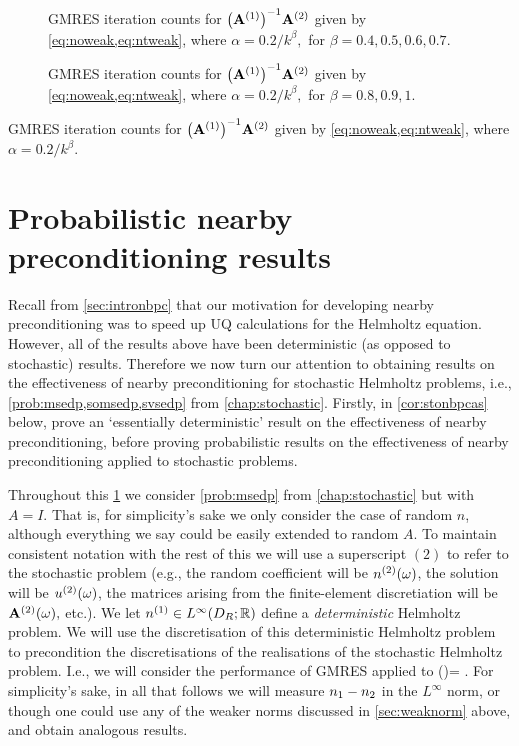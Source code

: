 \begin{figure}
  
    \caption{GMRES iteration counts for $\AmatoI\Amatt$ given by \cref{eq:noweak,eq:ntweak}, where $\alpha = 0.2/k^\beta,$ for $\beta = 0.4,0.5,0.6,0.7.$}\label{fig:l1med}
\end{figure}
    
    \begin{figure}
    
      \caption{GMRES iteration counts for $\AmatoI\Amatt$ given by \cref{eq:noweak,eq:ntweak}, where $\alpha = 0.2/k^\beta,$ for $\beta = 0.8,0.9,1.$}\label{fig:l1high}
\end{figure}
\begin{table}
  \centering
  
  \caption{GMRES iteration counts for $\AmatoI\Amatt$ given by \cref{eq:noweak,eq:ntweak}, where $\alpha = 0.2/k^\beta.$}\label{tab:l1}
  \end{table}

\section{Probabilistic nearby preconditioning results}\label{sec:nbpcstochastic}

Recall from \cref{sec:intronbpc} that our motivation for developing nearby preconditioning was to speed up UQ calculations for the Helmholtz equation. However, all of the results above have been deterministic (as opposed to stochastic) results. Therefore we now turn our attention to obtaining results on the effectiveness of nearby preconditioning for stochastic Helmholtz problems, i.e., \cref{prob:msedp,somsedp,svsedp} from \cref{chap:stochastic}. Firstly, in \cref{cor:stonbpcas} below, prove an `essentially deterministic' result on the effectiveness of nearby preconditioning, before proving probabilistic results on the effectiveness of nearby preconditioning applied to stochastic problems.

Throughout this \cref{sec:nbpcstochastic} we consider \cref{prob:msedp} from \cref{chap:stochastic} but with $A=I$. That is, for simplicity's sake we only consider the case of random $n$, although everything we say could be easily extended to random $A$. To maintain consistent notation with the rest of this  we will use a superscript $(2)$ to refer to the stochastic problem (e.g., the random coefficient will be ${n}^{(2)}(\omega)$, the solution will be ${u}^{(2)}(\omega)$, the matrices arising from the finite-element discretiation will be $\mathbf{A}^{(2)}(\omega),$ etc.). We let $\nso \in \LiDRRR$ define a \emph{deterministic} Helmholtz problem. We will use the discretisation of this deterministic Helmholtz problem to precondition the discretisations of the realisations of the stochastic Helmholtz problem. I.e., we will consider the performance of GMRES applied to
\beq\label{eq:stopc}
\AmatoI\Amatt(\omega)\bu = \AmatoI \bff.
\eeq
For simplicity's sake, in all that follows we will measure $n_{1}-n_{2}$ in the $L^{\infty}$ norm, or though one could use any of the weaker norms discussed in \cref{sec:weaknorm} above, and obtain analogous results.

